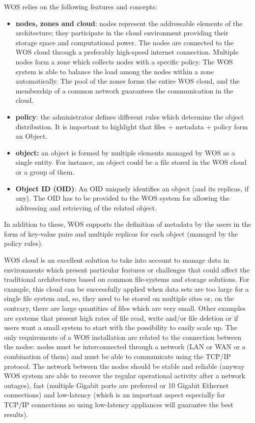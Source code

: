 WOS relies on the following features and concepts:
\begin{itemize}
\item \textbf{nodes, zones and cloud}: nodes represent the addressable elements of the architecture; they participate in the cloud environment providing their storage space and computational power.
The nodes are connected to the WOS cloud through a preferably high-speed internet connection.
Multiple nodes form a zone which collects nodes with a specific policy. The WOS system is able to balance the load among the nodes within a zone automatically.
The pool of the zones forms the entire WOS cloud, and the membership of a common network guarantees the communication in the cloud.
\item \textbf{policy}: the administrator defines different rules which determine the object distribution. It is important to highlight that files + metadata + policy form an Object.
\item \textbf{object:} an object is formed by multiple elements managed by WOS as a single entity. For instance, an object could be a file stored in the WOS cloud or a group of them.
\item \textbf{Object ID (OID)}: An OID uniquely identifies an object (and its replicas, if any). The OID has to be provided to the WOS system for allowing the addressing and retrieving of the related object.
\end{itemize}
In addition to these, WOS supports the definition of metadata by the users in the form of key-value pairs and multiple replicas for each object (managed by the policy rules).

WOS cloud is an excellent solution to take into account to manage data in environments which present particular features or challenges that could affect the traditional architectures based on common file-systems and storage solutions.
For example, this cloud can be successfully applied when data sets are too large for a single file system and, so, they need to be stored on multiple sites or, on the contrary, there are large quantities of files which are very small.
Other examples are systems that present high rates of file read, write and/or file deletion or if users want a small system to start with the possibility to easily scale up.
The only requirements of a WOS installation are related to the connection between the nodes: nodes must be interconnected through a network (LAN or WAN or a combination of them) and must be able to communicate using the TCP/IP protocol.
The network between the nodes should be stable and reliable (anyway WOS system are able to recover the regular operational activity after a network outages), fast (multiple Gigabit ports are preferred or 10 Gigabit Ethernet connections) and low-latency (which is an important aspect especially for TCP/IP connections so using low-latency appliances will guarantee the best results).

